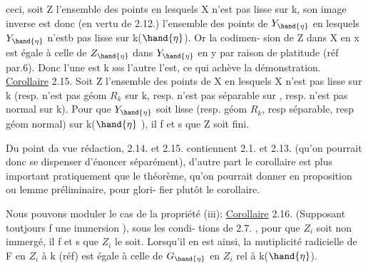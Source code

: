 
ceci, soit Z l'ensemble des points en lesquels X n'est pas lisse sur
k, son image inverse  est donc (en vertu de 2.12.)   l'ensemble des
points de $Y_{\hand{\eta}}$ en lesquels $Y_{\hand{\eta}}$ n'estb pas lisse sur k($\hand{\eta}$). Or  la codimen-%
sion de  Z dans X en x  est égale à celle de  $Z_{\hand{\eta}}$ dans $Y_{\hand{\eta}}$  en y par
raison de platitude (réf par.6). Donc l'une est \hand{$>$}k  sss l'autre l'est,
ce qui achève la démonstration.
\uline{Corollaire} 2.15.   Soit Z l'ensemble des points de X en lesquels
X n'est pas lisse sur k (resp. n'est pas  géom $R_k$ sur k, resp. n'est
 pas séparable sur  , resp. n'est pas  normal sur k). Pour que $Y_{\hand{\eta}}$ soit
lisse (resp.  géom $R_k$, resp séparable, resp géom normal) sur k($\hand{\eta}$ ), il
f et s  que Z soit fini.

 Du point da vue rédaction, 2.14. et 2.15.  contiennent 2.1. et
2.13. (qu'on pourrait donc se dispenser d'énoncer séparément), d'autre
part le corollaire est plus important pratiquement que le théorème,
qu'on pourrait donner en proposition ou lemme préliminaire, pour glori-%
fier plutôt le corollaire.

Nous pouvons  moduler   le cas de la propriété (iii):
\uline{Corollaire} 2.16.  (Supposant toutjours f une immersion ), sous les condi-%
 tions de 2.7. , pour que $Z_i$ soit non immergé, il f et s que $Z_i$  le soit.
Lorsqu'il en est ainsi, la mutiplicité radicielle de F en $Z_i$  
à k (réf) est égale à celle de $G_{\hand{\eta}}$  en $Z_i$  rel à k($\hand{\eta}$).

